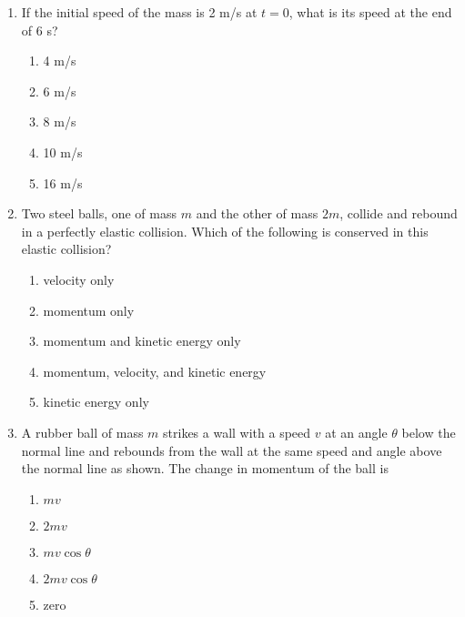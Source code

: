 \documentclass{../../../oss-apphys}
\begin{document}
\begin{multicols}{2}
\begin{enumerate}[leftmargin=18pt,resume]
  \item If the initial speed of the mass is 2 m/s at $t=0$, what is its speed
    at the end of 6 s?
    \label{impulse2}
    \begin{enumerate}[noitemsep,topsep=0pt,leftmargin=18pt,label=(\Alph*)]
    \item 4 m/s
    \item 6 m/s
    \item 8 m/s
    \item 10 m/s
    \item 16 m/s
    \end{enumerate}
    \columnbreak
    
  \item Two steel balls, one of mass $m$ and the other of mass $2m$, collide and
    rebound in a perfectly elastic collision. Which of the following is
    conserved in this elastic collision?
    \begin{enumerate}[noitemsep,topsep=0pt,leftmargin=18pt,label=(\Alph*)]
    \item velocity only
    \item momentum only
    \item momentum and kinetic energy only
    \item momentum, velocity, and kinetic energy
    \item kinetic energy only
    \end{enumerate}
    
  \item A rubber ball of mass $m$ strikes a wall with a speed $v$ at an angle
    $\theta$ below the normal line and rebounds from the wall at the same speed
    and angle above the normal line as shown. The change in momentum
    of the ball is
    \begin{center}
    \end{center}
    \begin{enumerate}[noitemsep,topsep=0pt,leftmargin=18pt,label=(\Alph*)]
    \item $mv$
    \item $2mv$
    \item $mv\cos\theta$
    \item $2mv\cos\theta$
    \item  zero
    \end{enumerate}
    

\end{enumerate}
\end{multicols}
\end{document}
